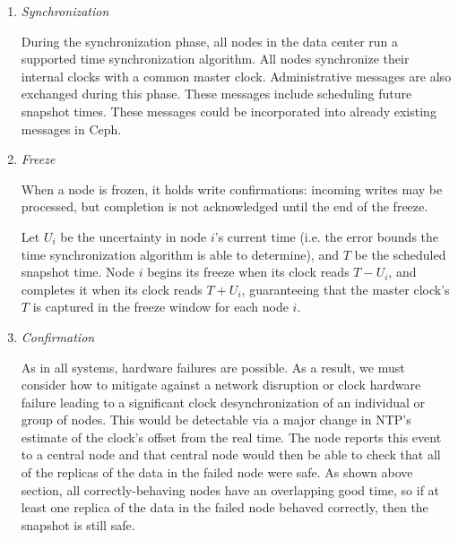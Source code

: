 \begin{enumerate}

\item \emph{Synchronization}

  During the synchronization phase, all nodes in the data center run a
  supported time synchronization algorithm. All nodes synchronize
  their internal clocks with a common master
  clock\footnotemark. Administrative messages are also exchanged
  during this phase. These messages include scheduling future snapshot
  times. These messages could be incorporated into already existing
  messages in Ceph.


\item \emph{Freeze}
  
  When a node is frozen, it holds write confirmations: incoming writes
  may be processed, but completion is not acknowledged until the end
  of the freeze.
  
  Let $U_i$ be the uncertainty in node $i$'s current time (i.e. the
  error bounds the time synchronization algorithm is able to
  determine), and $T$ be the scheduled snapshot time. Node $i$ begins
  its freeze when its clock reads $T - U_i$, and completes it when its
  clock reads $T + U_i$, guaranteeing that the master clock's $T$ is
  captured in the freeze window for each node $i$.

\item \emph{Confirmation}

  As in all systems, hardware failures are possible. As a result, we
  must consider how to mitigate against a network disruption or clock
  hardware failure leading to a significant clock desynchronization of
  an individual or group of nodes. This would be detectable via a
  major change in NTP's estimate of the clock's offset from the real
  time.  The node reports this event to a central node and that
  central node would then be able to check that all of the replicas of
  the data in the failed node were safe. As shown above section, all
  correctly-behaving nodes have an overlapping good time, so if at
  least one replica of the data in the failed node behaved correctly,
  then the snapshot is still safe.
  

\end{enumerate}
